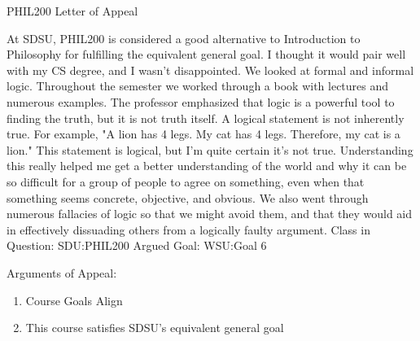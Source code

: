 \documentclass{article}
\begin{document}
\begin{center}
	PHIL200 Letter of Appeal
\end{center}

At SDSU, PHIL200 is considered a good alternative to Introduction to Philosophy for fulfilling the equivalent general goal. I thought it would pair well with my CS degree, and I wasn't disappointed. We looked at formal and informal logic. Throughout the semester we worked through a book with lectures and numerous examples. The professor emphasized that logic is a powerful tool to finding the truth, but it is not truth itself. A logical statement is not inherently true. For example, "A lion has 4 legs. My cat has 4 legs. Therefore, my cat is a lion." This statement is logical, but I'm quite certain it's not true. Understanding this really helped me get a better understanding of the world and why it can be so difficult for a group of people to agree on something, even when that something seems concrete, objective, and obvious. We also went through numerous fallacies of logic so that we might avoid them, and that they would aid in effectively dissuading others from a logically faulty argument.
\newline
Class in Question: SDU:PHIL200
\newline
Argued Goal: WSU:Goal 6

Arguments of Appeal:
\begin{enumerate}
	\item Course Goals Align
	\item This course satisfies SDSU's equivalent general goal
\end{enumerate}

\end{document}
